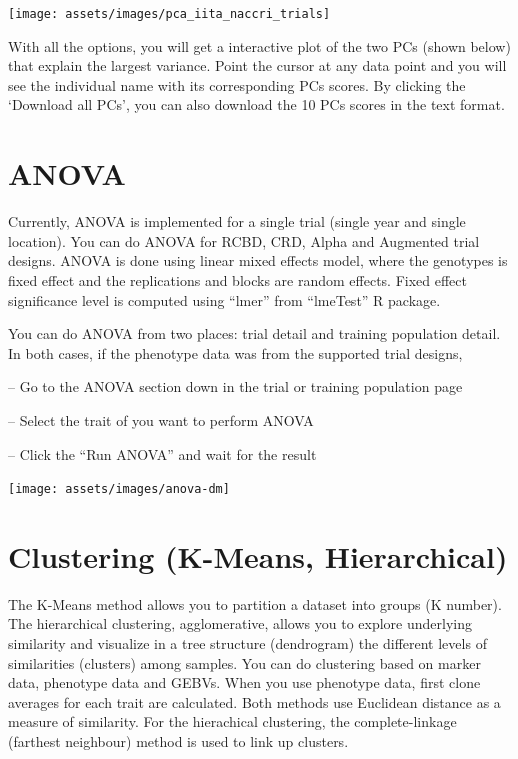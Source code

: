 \documentclass[
  12pt,
]{book}
\begin{document}
\begin{center}\texttt{[image: assets/images/pca\_iita\_naccri\_trials]} \end{center}

With all the options, you will get a interactive plot of the two PCs (shown below) that explain the largest variance. Point the cursor at any data point and you will see the individual name with its corresponding PCs scores. By clicking the `Download all PCs', you can also download the 10 PCs scores in the text format.

\hypertarget{anova}{%
\section{ANOVA}\label{anova}}

Currently, ANOVA is implemented for a single trial (single year and single location). You can do ANOVA for RCBD, CRD, Alpha and Augmented trial designs. ANOVA is done using linear mixed effects model, where the genotypes is fixed effect and the replications and blocks are random effects. Fixed effect significance level is computed using ``lmer'' from ``lmeTest'' R package.

You can do ANOVA from two places: trial detail and training population detail. In both cases, if the phenotype data was from the supported trial designs,

-- Go to the ANOVA section down in the trial or training population page

-- Select the trait of you want to perform ANOVA

-- Click the ``Run ANOVA'' and wait for the result

\begin{center}\texttt{[image: assets/images/anova-dm]} \end{center}

\hypertarget{clustering-k-means-hierarchical}{%
\section{Clustering (K-Means, Hierarchical)}\label{clustering-k-means-hierarchical}}

The K-Means method allows you to partition a dataset into groups (K number). The hierarchical clustering, agglomerative, allows you to explore underlying similarity and visualize in a tree structure (dendrogram) the different levels of similarities (clusters) among samples. You can do clustering based on marker data, phenotype data and GEBVs. When you use phenotype data, first clone averages for each trait are calculated. Both methods use Euclidean distance as a measure of similarity. For the hierachical clustering, the complete-linkage (farthest neighbour) method is used to link up clusters.
\end{document}
